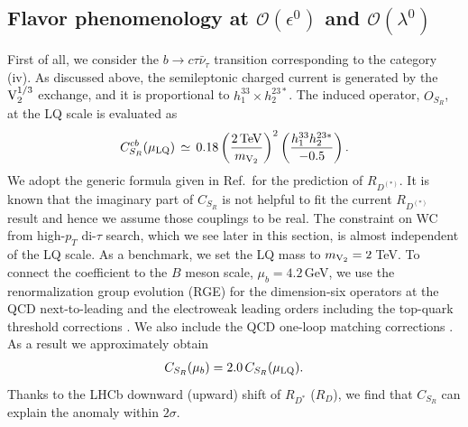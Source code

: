 \documentclass[12pt, a4paper]{article}
\numberwithin{equation}{section} %
\newcommand{\1}{\mbox{1}\hspace{-0.25em}\mbox{l}}
\begin{document}
\subsection{Flavor phenomenology at $\mathcal{O}(\epsilon^0)$ and $\mathcal{O}(\lambda^0)$ }
\label{sec:minimal_flavor}
First of all, we consider the $b\to c\tau\bar{\nu}_\tau$ transition corresponding to the category (iv).
As discussed above, the semileptonic charged current is generated by the ${\rm{V}}^{1/3}_2$ exchange, and it is proportional to 
$h_1^{33} \times h_2^{23*}$.
The induced operator, $O_{S_R}$, at the LQ scale is evaluated as
\begin{align}
C_{S_R}^{cb}(\mu_{\rm{LQ}})\,\simeq\,0.18\left(\frac{2\,{\rm{TeV}}}{m_{\rm{V}_2}}\right)^2\left(\frac{h_1^{33}h_2^{23*}}{-0.5}\right).
\label{eq:eq:CSRcb}
\end{align}
We adopt the generic formula given in Ref.\,\cite{Iguro:2022yzr} for the prediction of $R_{D^{(*)}}$.
It is known that the imaginary part of $C_{S_R}$ is not helpful to fit the current $R_{D^{(*)}}$ result and hence we assume those couplings to be real.
The constraint on WC from high-$p_T$ di-$\tau$ search, which we see later in this section, is almost independent of the LQ scale. 
As a benchmark, we set the LQ mass to $m_{\rm{V}_2}=2\,$TeV.
To connect the coefficient to the $B$ meson scale, $\mu_b=4.2$\,GeV, we use the renormalization group evolution (RGE) for the dimension-six operators at the QCD next-to-leading and the electroweak leading orders including the top-quark threshold corrections \cite{Jenkins:2013wua,Alonso:2013hga,Gonzalez-Alonso:2017iyc,Aebischer:2017gaw}.
We also include the QCD one-loop matching corrections \cite{Aebischer:2018acj}.
As a result we approximately obtain 
\begin{align}
C_{S_R}(\mu_b)=2.0\,C_{S_R}(\mu_{\rm LQ}).
\end{align}
Thanks to the LHCb downward (upward) shift of $R_{D^*}$ ($R_D$), we find that  $C_{S_R}$ can explain the anomaly within $2\sigma$.
\end{document}
